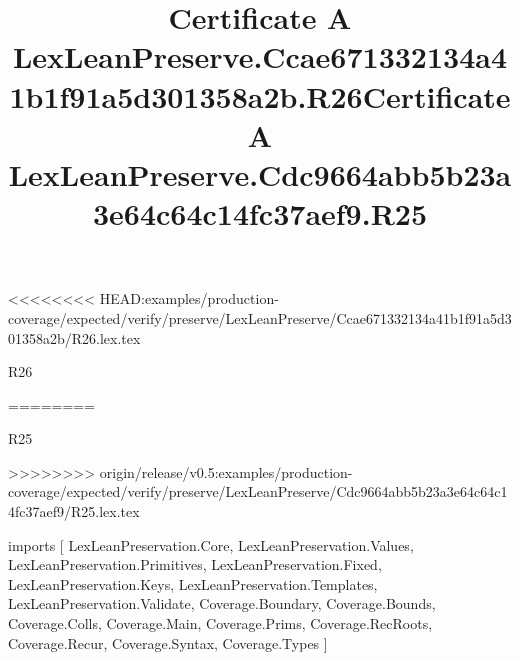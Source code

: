 <<<<<<<< HEAD:examples/production-coverage/expected/verify/preserve/LexLeanPreserve/Ccae671332134a41b1f91a5d301358a2b/R26.lex.tex
\begin{lexlean}{R26}
\title{Certificate A LexLeanPreserve.Ccae671332134a41b1f91a5d301358a2b.R26}
========
\begin{lexlean}{R25}
\title{Certificate A LexLeanPreserve.Cdc9664abb5b23a3e64c64c14fc37aef9.R25}
>>>>>>>> origin/release/v0.5:examples/production-coverage/expected/verify/preserve/LexLeanPreserve/Cdc9664abb5b23a3e64c64c14fc37aef9/R25.lex.tex
\begin{coremodule}
imports [
  LexLeanPreservation.Core,
  LexLeanPreservation.Values,
  LexLeanPreservation.Primitives,
  LexLeanPreservation.Fixed,
  LexLeanPreservation.Keys,
  LexLeanPreservation.Templates,
  LexLeanPreservation.Validate,
  Coverage.Boundary,
  Coverage.Bounds,
  Coverage.Colls,
  Coverage.Main,
  Coverage.Prims,
  Coverage.RecRoots,
  Coverage.Recur,
  Coverage.Syntax,
  Coverage.Types
]


\end{coremodule}
\end{lexlean}
\end{lexlean}
